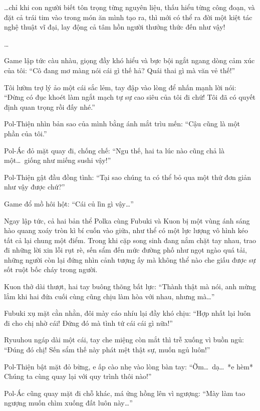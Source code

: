 \documentclass[../main.tex]{subfiles}
\begin{document}
\dots chỉ khi con người biết tôn trọng từng nguyên liệu, thấu hiểu từng công đoạn, và đặt cả trái tim vào trong món ăn mình tạo ra, thì mới có thể ra đời một kiệt tác nghệ thuật vĩ đại, lay động cả tâm hồn người thưởng thức đến như vậy!

\dots

Game lập tức càu nhàu, giọng đầy khó hiểu và bực bội ngắt ngang dòng cảm xúc của tôi: ``Cô đang mơ màng nói cái gì thế hả? Quái thai gì mà văn vẻ thế!''

Tôi lườm trợ lý ảo một cái sắc lẻm, tay đập vào lòng để nhấn mạnh lời nói: ``Đừng có đục khoét làm ngắt mạch tự sự cao siêu của tôi đi chứ! Tôi đã có quyết định quan trọng rồi đấy nhé.''

\pov{-}

Pol-Thiện nhìn bản sao của mình bằng ánh mắt trìu mến: ``Cậu cũng là một phần của tôi.''

Pol-Ác đỏ mặt quay đi, chống chế: ``Ngu thế, hai ta lúc nào cũng chả là một\dots\ giống như miếng sushi vậy!''

Pol-Thiện gật đầu đồng tình: ``Tại sao chúng ta có thể bỏ qua một thứ đơn giản như vậy được chứ?''

Game đổ mồ hôi hột: ``Cái củ lìn gì vậy\dots''

Ngay lập tức, cả hai bản thể Polka cùng Fubuki và Kuon bị một vùng ánh sáng hào quang xoáy tròn kì bí cuốn vào giữa, như thể có một lực lượng vô hình kéo tất cả lại chung một điểm. Trong khi cặp song sinh đang nắm chặt tay nhau, trao đi những lời xin lỗi rụt rè, sến sẩm đến mức đường phố như ngọt ngào quá tải, những người còn lại đứng nhìn cảnh tượng ấy mà không thể nào che giấu được sự sốt ruột bốc cháy trong người.


Kuon thở dài thượt, hai tay buông thõng bất lực: ``Thành thật mà nói, anh mừng lắm khi hai đứa cuối cùng cũng chịu làm hòa với nhau, nhưng mà\dots''

Fubuki xụ mặt cằn nhằn, đôi mày cáo nhíu lại đầy khó chịu: ``Hợp nhất lại luôn đi cho chị nhờ cái! Đứng đó mà tình tứ cái cái gì nữa!''

Ryuuhou ngáp dài một cái, tay che miệng còn mắt thì trễ xuống vì buồn ngủ: ``Đúng đó chị! Sến sẩm thế này phát mệt thật sự, muốn ngủ luôn!''

Pol-Thiện bật mặt đỏ bừng, e ấp cào nhẹ vào lòng bàn tay: ``Ờm\dots\ dạ\dots\ *e hèm* Chúng ta cùng quay lại với quy trình thôi nào!''

Pol-Ác cũng quay mặt đi chỗ khác, má ửng hồng lên vì ngượng: ``Mày làm tao ngượng muốn chìm xuống đất luôn này\dots''
\end{document}
